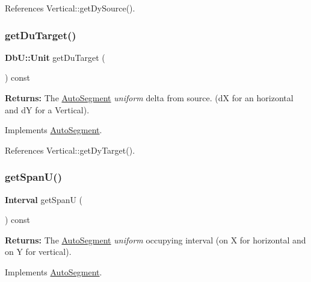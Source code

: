 References Vertical\+::get\+Dy\+Source().

\mbox{\label{classKatabatic_1_1AutoVertical_a76e349c14c904b3300a15caa1ee8b680}} 
\subsubsection{\texorpdfstring{get\+Du\+Target()}{getDuTarget()}}
{\footnotesize\ttfamily \textbf{ Db\+U\+::\+Unit} get\+Du\+Target (\begin{DoxyParamCaption}{ }\end{DoxyParamCaption}) const\hspace{0.3cm}{\ttfamily [virtual]}}

{\bfseries Returns\+:} The \hyperlink{classKatabatic_1_1AutoSegment}{Auto\+Segment} {\itshape uniform} delta from source. (dX for an horizontal and dY for a Vertical). 

Implements \hyperlink{classKatabatic_1_1AutoSegment_a0644d656eedc71dba2fb3c6c0d83ed3f}{Auto\+Segment}.



References Vertical\+::get\+Dy\+Target().

\mbox{\label{classKatabatic_1_1AutoVertical_a0b5ac47ab175815e1a9bc07f2517614a}} 
\subsubsection{\texorpdfstring{get\+Span\+U()}{getSpanU()}}
{\footnotesize\ttfamily \textbf{ Interval} get\+SpanU (\begin{DoxyParamCaption}{ }\end{DoxyParamCaption}) const\hspace{0.3cm}{\ttfamily [virtual]}}

{\bfseries Returns\+:} The \hyperlink{classKatabatic_1_1AutoSegment}{Auto\+Segment} {\itshape uniform} occupying interval (on X for horizontal and on Y for vertical). 

Implements \hyperlink{classKatabatic_1_1AutoSegment_a248eb2fbb06e3286650b28567d495f0b}{Auto\+Segment}.



